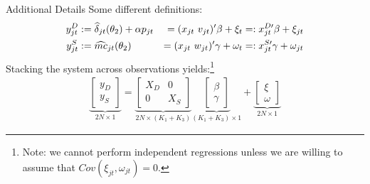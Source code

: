 \documentclass[aspectratio=169,11pt]{beamer}
\begin{document}
\begin{frame}{Additional Details}
Some different definitions:
\begin{alignat}{3}
\label{eq:stacked}
\nonumber y_{jt}^D &:= \widehat \delta_{jt}(\theta_2) + \alpha p_{jt} &=(x_{jt} \-\ v_{jt})' \beta + \xi_t &=: x_{jt}^{D\prime}\beta + \xi_{jt} \\ 
y_{jt}^S &:= \widehat{mc}_{jt}(\theta_2) &= (x_{jt} \-\ w_{jt})'\gamma + \omega_t &=: x_{jt}^{S\prime} \gamma + \omega_{jt} 
\end{alignat}
Stacking the system across observations yields:\footnote{Note: we cannot perform independent regressions unless we are willing to assume that $Cov(\xi_{jt},\omega_{jt})=0$.}
\begin{align}
\underbrace{\begin{bmatrix} y_D \\ y_S \end{bmatrix}}_{2N\times1} = 
\underbrace{\begin{bmatrix}
X_D & 0 \\
0 & X_S 
\end{bmatrix}}_{2N\times(K_1+K_3)}
\underbrace{\begin{bmatrix}
\beta \\ \gamma %
\end{bmatrix}}_{(K_1+K_3)\times1} + 
\underbrace{\begin{bmatrix}
\xi \\ \omega %
\end{bmatrix}}_{2N\times 1}
\end{align}
\end{frame}

%
%
%
%
\end{document}
